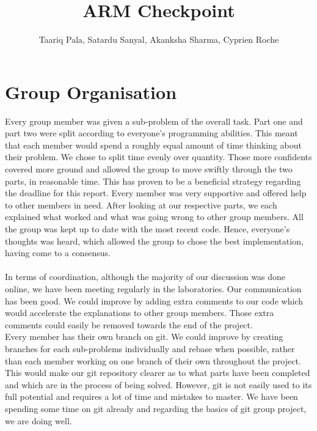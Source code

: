 \documentclass[11pt]{article}
\begin{document}
\title{ARM Checkpoint}
\author{Taariq Pala, Satardu Sanyal, Akanksha Sharma, Cyprien Roche}

\maketitle

\section{Group Organisation}

Every group member was given a sub-problem of the overall task. Part one and part two were split according to everyone's programming abilities. This meant that each member would spend a roughly equal amount of time thinking about their problem. We chose to split time evenly over quantity. Those more confidents covered more ground and allowed the group to move swiftly through the two parts, in reasonable time. This has proven to be a beneficial strategy regarding the deadline for this report. Every member was very supportive and offered help to other members in need. After looking at our respective parts, we each explained what worked and what was going wrong to other group members. All the group was kept up to date with the most recent code. Hence, everyone's thoughts was heard, which allowed the group to chose the best implementation, having come to a consensus.
\\
\\
In terms of coordination, although the majority of our discussion was done online, we have been meeting regularly in the laboratories. Our communication has been good. We could improve by adding extra comments to our code which would accelerate the explanations to other group members. Those extra comments could easily be removed towards the end of the project.
\\
Every member has their own branch on git. We could improve by creating branches for each sub-problems individually and rebase when possible, rather than each member working on one branch of their own throughout the project. This would make our git repository clearer as to what parts have been completed and which are in the process of being solved. However, git is not easily used to its full potential and requires a lot of time and mistakes to master. We have been spending some time on git already and regarding the basics of git group project, we are doing well. 
\end{document}
